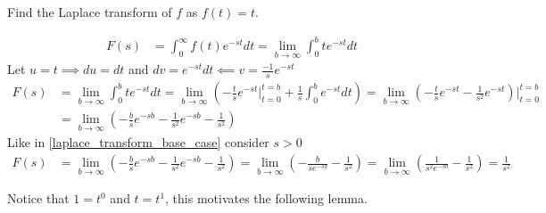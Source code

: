 \documentclass[notes]{subfiles}
\begin{document}
\begin{exercise}
    Find the Laplace transform of $f$ as $f(t) = t$.
\end{exercise}
\begin{solution}
    \begin{align*}
        F(s)
        &= \int_0^\infty f(t)e^{-st}dt
        = \lim_{b\to\infty} \int_0^b te^{-st}dt
    \end{align*}
    Let $u = t \implies du = dt$ and $dv = e^{-st}dt \impliedby v = \frac{-1}{s}e^{-st}$
    \begin{align*}
        F(s)
        &= \lim_{b\to\infty} \int_0^b te^{-st}dt
        = \lim_{b\to\infty} \left( -\frac{t}{s}e^{-st}\Big|_{t = 0}^{t = b} + \frac{1}{s} \int_0^b e^{-st}dt \right)
        = \lim_{b\to\infty} \left( -\frac{t}{s}e^{-st} - \frac{1}{s^2} e^{-st} \right)\Bigg|_{t = 0}^{t = b} \\
        &= \lim_{b\to\infty} \left( -\frac{b}{s}e^{-sb} - \frac{1}{s^2}e^{-sb} - \frac{1}{s^2} \right)
    \end{align*}
    Like in \cref{laplace_transform_base_case} consider $s > 0$
    \begin{align*}
        F(s)
        &= \lim_{b\to\infty} \left( -\frac{b}{s}e^{-sb} - \frac{1}{s^2}e^{-sb} - \frac{1}{s^2} \right)
        = \lim_{b\to\infty} \left( -\frac{b}{se^{-sb}} - \frac{1}{s^2} \right)
        = \lim_{b\to\infty} \left( \frac{1}{s^2e^{-sb}} - \frac{1}{s^2} \right)
        = \frac{1}{s^2}
    \end{align*}
\end{solution}

Notice that $1 = t^0$ and $t = t^1$, this motivates the following lemma.
\end{document}

